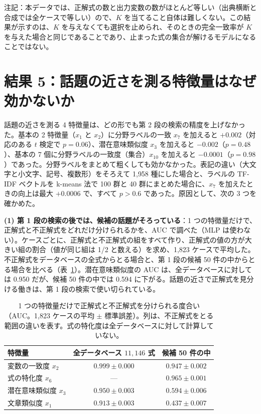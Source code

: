 \documentclass[a4j,dvipdfmx,11pt]{jresume}
\begin{document}
注記：本データでは、正解式の数と出力変数の数がほとんど等しい（出典横断と合成では全ケースで等しい）ので、$K$ を当てること自体は難しくない。この結果が示すのは、$K$ を与えなくても選択を止められ、そのときの完全一致率が $K$ を与えた場合と同じであることであり、止まった式の集合が解けるモデルになることではない。

\section{結果 5：話題の近さを測る特徴量はなぜ効かないか}\label{sec:topic}
話題の近さを測る 4 特徴量は、どの形でも第 2 段の検索の精度を上げなかった。基本の 2 特徴量（$x_1$ と $x_2$）に分野ラベルの一致 $x_7$ を加えると $+0.002$（対応のある $t$ 検定で $p = 0.06$）、潜在意味類似度 $x_3$ を加えると $-0.002$（$p = 0.48$）、基本の 7 個に分野ラベルの一致度（集合）$x_{10}$ を加えると $-0.0001$（$p = 0.98$）であった。分野ラベルをまとめて粗くしても効かなかった。表記の違い（大文字と小文字、記号、複数形）をそろえて 1{,}958 種にした場合と、ラベルの TF-IDF ベクトルを k-means 法で 100 群と 40 群にまとめた場合に、$x_7$ を加えたときの向上は最大 $+0.0006$ で、すべて $p > 0.6$ であった。原因として、次の 3 つを確かめた。

\textbf{(1) 第 1 段の検索の後では、候補の話題がそろっている}：1 つの特徴量だけで、正解式と不正解式をどれだけ分けられるかを、AUC で調べた（MLP は使わない）。ケースごとに、正解式と不正解式の組をすべて作り、正解式の値の方が大きい組の割合（値が同じ組は 1/2 と数える）を求め、1{,}823 ケースで平均した。不正解式をデータベースの全式からとる場合と、第 1 段の候補 50 件の中からとる場合を比べる（表~\ref{tab:auc}）。潜在意味類似度の AUC は、全データベースに対しては 0.950 だが、候補 50 件の中では 0.594 に下がる。話題の近さで正解式を見分ける働きは、第 1 段の検索で使い切られている。

\begin{table}[t]\centering
\small
\caption{1 つの特徴量だけで正解式と不正解式を分けられる度合い（AUC。1{,}823 ケースの平均 $\pm$ 標準誤差）。列は、不正解式をとる範囲の違いを表す。式の特化度は全データベースに対して計算していない。}
\label{tab:auc}
\begin{tabular}{lcc}
\toprule
特徴量 & 全データベース $11{,}146$ 式 & 候補 50 件の中 \\
\midrule
変数の一致度 $x_2$ & $0.999 \pm 0.000$ & $0.947 \pm 0.002$ \\
式の特化度 $x_6$ & --- & $0.965 \pm 0.001$ \\
潜在意味類似度 $x_3$ & $0.950 \pm 0.003$ & $0.594 \pm 0.006$ \\
文章類似度 $x_1$ & $0.913 \pm 0.003$ & $0.437 \pm 0.007$ \\
\bottomrule
\end{tabular}
\end{table}
\end{document}
